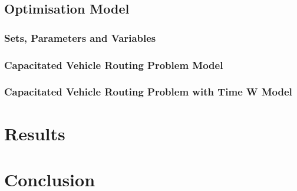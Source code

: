 \documentclass[a4paper, 12pt]{report}
\begin{document}
\section{Optimisation Model}
\subsection{Sets, Parameters and Variables}
\subsection{Capacitated Vehicle Routing Problem Model}
\subsection{Capacitated Vehicle Routing Problem with Time W Model}

\chapter{Results}


\chapter{Conclusion}
\end{document}
